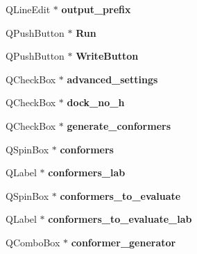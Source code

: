 \begin{DoxyCompactItemize}
\item 
\hypertarget{classDockWidget_ad5c52d96c53c73387695f085632db76f}{
QLineEdit $\ast$ {\bfseries output\_\-prefix}}
\label{classDockWidget_ad5c52d96c53c73387695f085632db76f}

\item 
\hypertarget{classDockWidget_aff6e88bab1a147ed321dfbc6f25e73c2}{
QPushButton $\ast$ {\bfseries Run}}
\label{classDockWidget_aff6e88bab1a147ed321dfbc6f25e73c2}

\item 
\hypertarget{classDockWidget_ae007ff5bf94c33e94f70665ad6c4eae2}{
QPushButton $\ast$ {\bfseries WriteButton}}
\label{classDockWidget_ae007ff5bf94c33e94f70665ad6c4eae2}

\item 
\hypertarget{classDockWidget_a7787d7a3347ff07fa8b7484d1b86ead2}{
QCheckBox $\ast$ {\bfseries advanced\_\-settings}}
\label{classDockWidget_a7787d7a3347ff07fa8b7484d1b86ead2}

\item 
\hypertarget{classDockWidget_a809234460c9f26d9807202b274e7a13c}{
QCheckBox $\ast$ {\bfseries dock\_\-no\_\-h}}
\label{classDockWidget_a809234460c9f26d9807202b274e7a13c}

\item 
\hypertarget{classDockWidget_a4b5cc5dfa27d8ec920b71f5146242b58}{
QCheckBox $\ast$ {\bfseries generate\_\-conformers}}
\label{classDockWidget_a4b5cc5dfa27d8ec920b71f5146242b58}

\item 
\hypertarget{classDockWidget_ad09c9c277862481c3fa7aae745120b1e}{
QSpinBox $\ast$ {\bfseries conformers}}
\label{classDockWidget_ad09c9c277862481c3fa7aae745120b1e}

\item 
\hypertarget{classDockWidget_adef864f81e794b0a3a88ba9c05793891}{
QLabel $\ast$ {\bfseries conformers\_\-lab}}
\label{classDockWidget_adef864f81e794b0a3a88ba9c05793891}

\item 
\hypertarget{classDockWidget_a38a68ac2e52e88929931072df118a6a3}{
QSpinBox $\ast$ {\bfseries conformers\_\-to\_\-evaluate}}
\label{classDockWidget_a38a68ac2e52e88929931072df118a6a3}

\item 
\hypertarget{classDockWidget_a2efbb1a85425b94a0075a587945b82b1}{
QLabel $\ast$ {\bfseries conformers\_\-to\_\-evaluate\_\-lab}}
\label{classDockWidget_a2efbb1a85425b94a0075a587945b82b1}

\item 
\hypertarget{classDockWidget_aa06f93f3594fa0facb3871bbc00bf101}{
QComboBox $\ast$ {\bfseries conformer\_\-generator}}
\label{classDockWidget_aa06f93f3594fa0facb3871bbc00bf101}


\end{DoxyCompactItemize}
